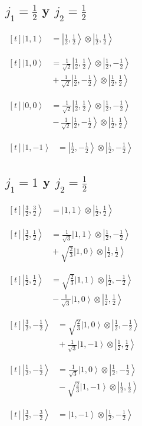 \documentclass[11pt,a4paper]{article}
\newcommand{\estadocelda}[1]{%
  \begin{minipage}[t]{0.48\linewidth}
  \small\raggedright
  \(\displaystyle\begin{aligned}[t]#1\end{aligned}\)
  \end{minipage}%
}
\newcommand{\ket}[1]{\left|#1\right\rangle}
\begin{document}
\subsection{\texorpdfstring{$j_1=\frac{1}{2}$ y $j_2=\frac{1}{2}$}{j1=1/2 y j2=1/2}}

\noindent\estadocelda{
\ket{1,1} &= \ket{\frac{1}{2},\frac{1}{2}}\otimes\ket{\frac{1}{2},\frac{1}{2}}
}\hfill\estadocelda{
\ket{1,0} &= \frac{1}{\sqrt{2}}\ket{\frac{1}{2},\frac{1}{2}}\otimes\ket{\frac{1}{2},-\frac{1}{2}} \\
 &{}+\frac{1}{\sqrt{2}}\ket{\frac{1}{2},-\frac{1}{2}}\otimes\ket{\frac{1}{2},\frac{1}{2}}
}\par\addvspace{1.4em}

\noindent\estadocelda{
\ket{0,0} &= \frac{1}{\sqrt{2}}\ket{\frac{1}{2},\frac{1}{2}}\otimes\ket{\frac{1}{2},-\frac{1}{2}} \\
 &{}-\frac{1}{\sqrt{2}}\ket{\frac{1}{2},-\frac{1}{2}}\otimes\ket{\frac{1}{2},\frac{1}{2}}
}\hfill\estadocelda{
\ket{1,-1} &= \ket{\frac{1}{2},-\frac{1}{2}}\otimes\ket{\frac{1}{2},-\frac{1}{2}}
}\par\addvspace{1.4em}

\subsection{\texorpdfstring{$j_1=1$ y $j_2=\frac{1}{2}$}{j1=1 y j2=1/2}}

\noindent\estadocelda{
\ket{\frac{3}{2},\frac{3}{2}} &= \ket{1,1}\otimes\ket{\frac{1}{2},\frac{1}{2}}
}\hfill\estadocelda{
\ket{\frac{3}{2},\frac{1}{2}} &= \frac{1}{\sqrt{3}}\ket{1,1}\otimes\ket{\frac{1}{2},-\frac{1}{2}} \\
 &{}+\sqrt{\frac{2}{3}}\ket{1,0}\otimes\ket{\frac{1}{2},\frac{1}{2}}
}\par\addvspace{1.4em}

\noindent\estadocelda{
\ket{\frac{1}{2},\frac{1}{2}} &= \sqrt{\frac{2}{3}}\ket{1,1}\otimes\ket{\frac{1}{2},-\frac{1}{2}} \\
 &{}-\frac{1}{\sqrt{3}}\ket{1,0}\otimes\ket{\frac{1}{2},\frac{1}{2}}
}\hfill\estadocelda{
\ket{\frac{3}{2},-\frac{1}{2}} &= \sqrt{\frac{2}{3}}\ket{1,0}\otimes\ket{\frac{1}{2},-\frac{1}{2}} \\
 &{}+\frac{1}{\sqrt{3}}\ket{1,-1}\otimes\ket{\frac{1}{2},\frac{1}{2}}
}\par\addvspace{1.4em}

\noindent\estadocelda{
\ket{\frac{1}{2},-\frac{1}{2}} &= \frac{1}{\sqrt{3}}\ket{1,0}\otimes\ket{\frac{1}{2},-\frac{1}{2}} \\
 &{}-\sqrt{\frac{2}{3}}\ket{1,-1}\otimes\ket{\frac{1}{2},\frac{1}{2}}
}\hfill\estadocelda{
\ket{\frac{3}{2},-\frac{3}{2}} &= \ket{1,-1}\otimes\ket{\frac{1}{2},-\frac{1}{2}}
}\par\addvspace{1.4em}
\end{document}
